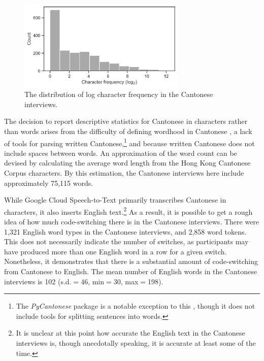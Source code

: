 \begin{figure}[!htbp]
\begin{center}
\includegraphics[width=8cm]{figures/2-can_char_frequency.png} 
\caption{The distribution of log character frequency in the Cantonese interviews.}
\label{ch2:fig:ccf}
\end{center}
\end{figure}

The decision to report descriptive statistics for Cantonese in characters rather than words arises from the difficulty of defining wordhood in Cantonese \citep{wong_2006_fusion}, a lack of tools for parsing written Cantonese,\footnote{The \textit{PyCantonese} package is a notable exception to this \citep{lee_2018_pycantonese}, though it does not include tools for splitting sentences into words.} and because written Cantonese does not include spaces between words. An approximation of the word count can be devised by calculating the average word length from the Hong Kong Cantonese Corpus \citep{luke_2015_hkc} characters. By this estimation, the Cantonese interviews here include approximately 75,115 words.

While Google Cloud Speech-to-Text primarily transcribes Cantonese in characters, it also inserts English text.\footnote{It is unclear at this point how accurate the English text in the Cantonese interviews is, though anecdotally speaking, it is accurate at least some of the time.} As a result, it is possible to get a rough idea of how much code-switching there is in the Cantonese interviews. There were 1,321 English word types in the Cantonese interviews, and 2,858 word tokens. This does not necessarily indicate the number of switches, as participants may have produced more than one English word in a row for a given switch. Nonetheless, it demonstrates that there is a substantial amount of code-switching from Cantonese to English. The mean number of English words in the Cantonese interviews is 102 (s.d.$=$46, min$=$30, max$=$198). 

